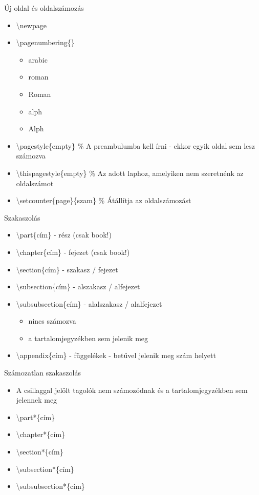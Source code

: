 \documentclass[11pt]{beamer}
\newcommand{\tbs}{\textbackslash}
\begin{document}
\begin{frame}{Új oldal és oldalszámozás}
\begin{itemize}
\item \tbs newpage
\item \tbs pagenumbering\{\}
	\begin{itemize}
	\item arabic
	\item roman
	\item Roman
	\item alph
	\item Alph
	\end{itemize}
\item \tbs pagestyle\{empty\} \% A preambulumba kell írni - ekkor egyik oldal sem lesz számozva
\item \tbs thispagestyle\{empty\} \% Az adott laphoz, amelyiken nem szeretnénk az oldalszámot
\item \tbs setcounter\{page\}\{szam\} \% Átállítja az oldalszámozást
\end{itemize}
\end{frame}

\begin{frame}{Szakaszolás}
\begin{itemize}
\item	\tbs part\{cím\} - rész (csak book!)
\item	\tbs chapter\{cím\} - fejezet (csak book!)
\item	\tbs section\{cím\} - szakasz / fejezet
\item   \tbs subsection\{cím\} - alszakasz / alfejezet
\item	\tbs subsubsection\{cím\} - alalszakasz / alalfejezet
		\begin{itemize}
		\item	nincs számozva
		\item	a tartalomjegyzékben sem jelenik meg
		\end{itemize}
\item	\tbs appendix\{cím\} - függelékek - betűvel jelenik meg szám helyett
\end{itemize}
\end{frame}
 
\begin{frame}{Számozatlan szakaszolás}
\begin{itemize}
\item A csillaggal jelölt tagolók nem számozódnak és a tartalomjegyzékben sem jelennek meg
\end{itemize}

\vspace{1cm}

\begin{itemize}
\item	\tbs part*\{cím\}
\item	\tbs chapter*\{cím\}
\item	\tbs section*\{cím\}
\item   \tbs subsection*\{cím\}
\item	\tbs subsubsection*\{cím\}
\end{itemize}
\end{frame}
\end{document}
